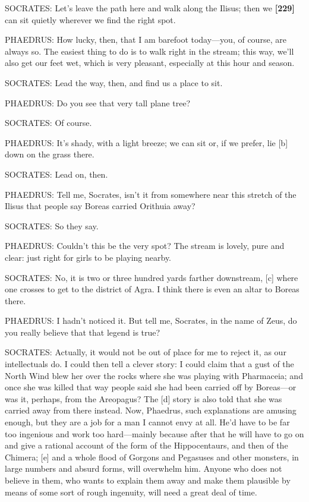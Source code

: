 SOCRATES: Let's leave the path here and walk along the Ilisus; then we
{\bf {[}229{]}} can sit quietly wherever we find the right spot.

PHAEDRUS: How lucky, then, that I am barefoot today---you, of course,
are always so. The easiest thing to do is to walk right in the stream;
this way, we'll also get our feet wet, which is very pleasant,
especially at this hour and season.

SOCRATES: Lead the way, then, and find us a place to sit.

PHAEDRUS: Do you see that very tall plane tree?

SOCRATES: Of course.

PHAEDRUS: It's shady, with a light breeze; we can sit or, if we prefer,
lie {[}b{]} down on the grass there.

SOCRATES: Lead on, then.

PHAEDRUS: Tell me, Socrates, isn't it from somewhere near this stretch
of the Ilisus that people say Boreas carried Orithuia
away?

SOCRATES: So they say.

PHAEDRUS: Couldn't this be the very spot? The stream is lovely, pure and
clear: just right for girls to be playing nearby.

SOCRATES: No, it is two or three hundred yards farther downstream,
{[}c{]} where one crosses to get to the district of Agra. I think there
is even an altar to Boreas there.

PHAEDRUS: I hadn't noticed it. But tell me, Socrates, in the name of
Zeus, do you really believe that that legend is true?

SOCRATES: Actually, it would not be out of place for me to reject it, as
our intellectuals do. I could then tell a clever story: I could claim
that a gust of the North Wind blew her over the rocks where she was
playing with Pharmaceia; and once she was killed that way people said
she had been carried off by Boreas---or was it, perhaps, from the
Areopagus? The {[}d{]} story is also told that she was carried away from
there instead. Now, Phaedrus, such explanations are amusing enough, but
they are a job for a man I cannot envy at all. He'd have to be far too
ingenious and work too hard---mainly because after that he will have to
go on and give a rational account of the form of the Hippocentaurs, and
then of the Chimera; {[}e{]} and a whole flood of Gorgons and Pegasuses
and other monsters, in large numbers and absurd forms, will overwhelm
him. Anyone who does not believe in them, who wants to explain them away
and make them plausible by means of some sort of rough ingenuity, will
need a great deal of time.

